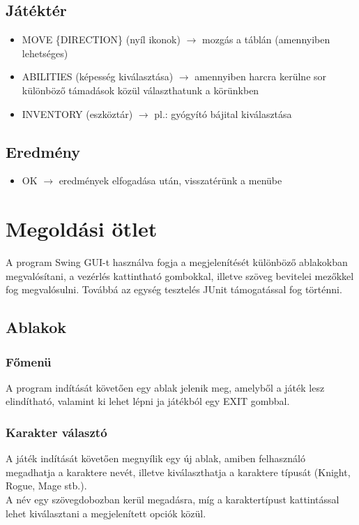 \documentclass[12pt,a4paper]{article}
\begin{document}
	\subsection{Játéktér}
	\begin{itemize}
		\item MOVE \{DIRECTION\} (nyíl ikonok) $\rightarrow$ mozgás a táblán (amennyiben lehetséges)
		\item ABILITIES (képesség kiválasztása) $\rightarrow$ amennyiben harcra kerülne sor különböző támadások közül választhatunk a körünkben
		\item INVENTORY (eszköztár) $\rightarrow$ pl.: gyógyító bájital kiválasztása 
	\end{itemize}
	
	\subsection{Eredmény}
	\begin{itemize}
		\item OK $\rightarrow$ eredmények elfogadása után, visszatérünk a menübe
	\end{itemize}
	
	\section{Megoldási ötlet}
	A program Swing GUI-t használva fogja a megjelenítését különböző ablakokban megvalósítani, a vezérlés kattintható gombokkal, illetve szöveg bevitelei mezőkkel fog megvalósulni. Továbbá az egység tesztelés JUnit támogatással fog történni.
	\subsection{Ablakok}
	\subsubsection{Főmenü}
	A program indítását követően egy ablak jelenik meg, amelyből a játék lesz elindítható, valamint ki lehet lépni ja játékból egy EXIT gombbal.
	
	\subsubsection{Karakter választó}
	A játék indítását követően megnyílik egy új ablak, amiben felhasználó megadhatja a karaktere nevét, illetve kiválaszthatja a karaktere típusát (Knight, Rogue, Mage stb.).\\
	A név egy szövegdobozban kerül megadásra, míg a karaktertípust kattintással lehet kiválasztani a megjelenített opciók közül.
	
\end{document}
